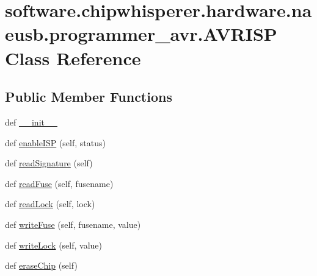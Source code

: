 \hypertarget{classsoftware_1_1chipwhisperer_1_1hardware_1_1naeusb_1_1programmer__avr_1_1AVRISP}{}\section{software.\+chipwhisperer.\+hardware.\+naeusb.\+programmer\+\_\+avr.\+A\+V\+R\+I\+S\+P Class Reference}
\label{classsoftware_1_1chipwhisperer_1_1hardware_1_1naeusb_1_1programmer__avr_1_1AVRISP}
\subsection*{Public Member Functions}
\begin{DoxyCompactItemize}
\item 
def \hyperlink{classsoftware_1_1chipwhisperer_1_1hardware_1_1naeusb_1_1programmer__avr_1_1AVRISP_a79dd80cda2f8f1d1a269f46e30e44933}{\+\_\+\+\_\+init\+\_\+\+\_\+}
\item 
def \hyperlink{classsoftware_1_1chipwhisperer_1_1hardware_1_1naeusb_1_1programmer__avr_1_1AVRISP_affd2dbf3053a0b3aaffb1d47023b918d}{enable\+I\+S\+P} (self, status)
\item 
def \hyperlink{classsoftware_1_1chipwhisperer_1_1hardware_1_1naeusb_1_1programmer__avr_1_1AVRISP_a1dc123d4f23f16778e6a6d16f913b79f}{read\+Signature} (self)
\item 
def \hyperlink{classsoftware_1_1chipwhisperer_1_1hardware_1_1naeusb_1_1programmer__avr_1_1AVRISP_acdbed75b76ed7edcabfb70a8cce6f2bf}{read\+Fuse} (self, fusename)
\item 
def \hyperlink{classsoftware_1_1chipwhisperer_1_1hardware_1_1naeusb_1_1programmer__avr_1_1AVRISP_af5ba5e84200073c0314127501fc063ca}{read\+Lock} (self, lock)
\item 
def \hyperlink{classsoftware_1_1chipwhisperer_1_1hardware_1_1naeusb_1_1programmer__avr_1_1AVRISP_a7a79f9469caa4ca900935c513f3eb1f2}{write\+Fuse} (self, fusename, value)
\item 
def \hyperlink{classsoftware_1_1chipwhisperer_1_1hardware_1_1naeusb_1_1programmer__avr_1_1AVRISP_a3050b15c2a86d668f1c123cd1d77a3ae}{write\+Lock} (self, value)
\item 
def \hyperlink{classsoftware_1_1chipwhisperer_1_1hardware_1_1naeusb_1_1programmer__avr_1_1AVRISP_ae9f45698adecdf0e48b9b5e68557e07e}{erase\+Chip} (self)
\item 

\end{DoxyCompactItemize}

